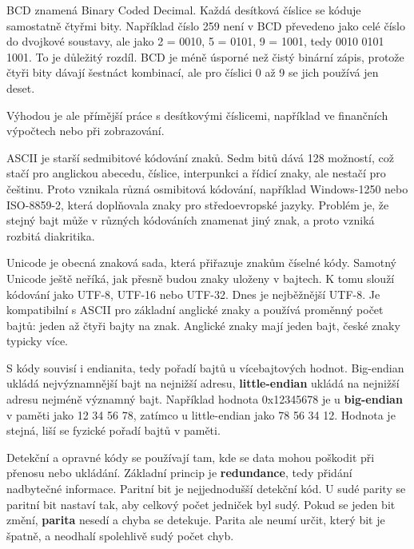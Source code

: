 BCD znamená Binary Coded Decimal. Každá desítková číslice se kóduje samostatně čtyřmi bity. Například číslo 259 není v BCD převedeno jako celé číslo do dvojkové soustavy, ale jako 2 = 0010, 5 = 0101, 9 = 1001, tedy 0010 0101 1001. To je důležitý rozdíl. BCD je méně úsporné než čistý binární zápis, protože čtyři bity dávají šestnáct kombinací, ale pro číslici 0 až 9 se jich používá jen deset.

Výhodou je ale přímější práce s desítkovými číslicemi, například ve finančních výpočtech nebo při zobrazování.

ASCII je starší sedmibitové kódování znaků. Sedm bitů dává 128 možností, což stačí pro anglickou abecedu, číslice, interpunkci a řídicí znaky, ale nestačí pro češtinu. Proto vznikala různá osmibitová kódování, například Windows-1250 nebo ISO-8859-2, která doplňovala znaky pro středoevropské jazyky. Problém je, že stejný bajt může v různých kódováních znamenat jiný znak, a proto vzniká rozbitá diakritika.

Unicode je obecná znaková sada, která přiřazuje znakům číselné kódy. Samotný Unicode ještě neříká, jak přesně budou znaky uloženy v bajtech. K tomu slouží kódování jako UTF-8, UTF-16 nebo UTF-32. Dnes je nejběžnější UTF-8. Je kompatibilní s ASCII pro základní anglické znaky a používá proměnný počet bajtů: jeden až čtyři bajty na znak. Anglické znaky mají jeden bajt, české znaky typicky více.


S kódy souvisí i endianita, tedy pořadí bajtů u vícebajtových hodnot. Big-endian ukládá nejvýznamnější bajt na nejnižší adresu, \textbf{little-endian} ukládá na nejnižší adresu nejméně významný bajt. Například hodnota 0x12345678 je u \textbf{big-endian} v paměti jako 12 34 56 78, zatímco u little-endian jako 78 56 34 12. Hodnota je stejná, liší se fyzické pořadí bajtů v paměti.

Detekční a opravné kódy se používají tam, kde se data mohou poškodit při přenosu nebo ukládání. Základní princip je \textbf{redundance}, tedy přidání nadbytečné informace. Paritní bit je nejjednodušší detekční kód. U sudé parity se paritní bit nastaví tak, aby celkový počet jedniček byl sudý. Pokud se jeden bit změní, \textbf{parita} nesedí a chyba se detekuje. Parita ale neumí určit, který bit je špatně, a neodhalí spolehlivě sudý počet chyb.

